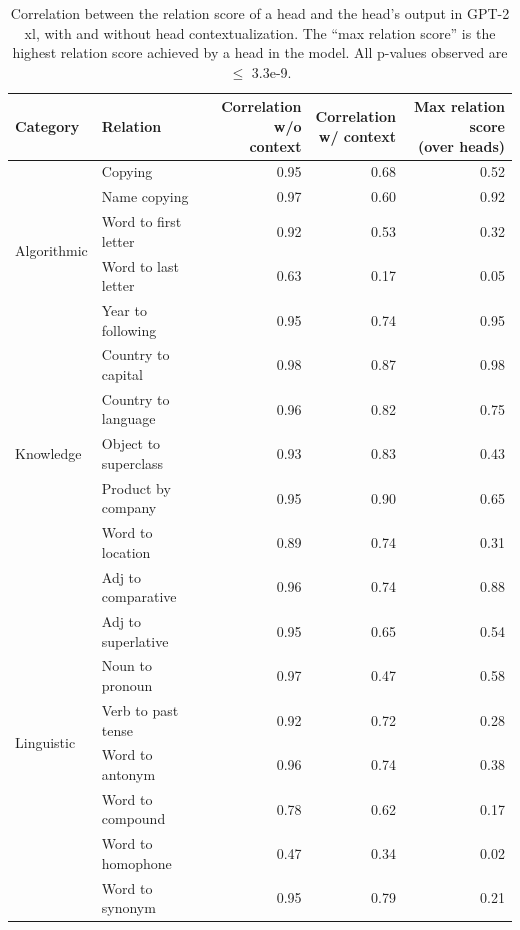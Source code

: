 \documentclass[11pt]{article}
\newcommand{\GPTxl}{GPT-2 xl}
\begin{document}
\begin{table}[p]
\centering
\footnotesize

\begin{tabular}{llrrr}
\toprule
Category & Relation & \makecell{Correlation\\w/o context} & \makecell{Correlation\\w/ context} &  \makecell{Max relation score\\(over heads)} \\
\midrule
\multirow{5}{*}{Algorithmic} & Copying & 0.95 &  0.68  & 0.52 \\
 & Name copying & 0.97 &  0.60  & 0.92 \\
 & Word to first letter & 0.92 &  0.53  & 0.32 \\
 & Word to last letter & 0.63  & 0.17  & 0.05 \\
 & Year to following & 0.95 &  0.74  & 0.95 \\
\midrule
\multirow{5}{*}{Knowledge} & Country to capital & 0.98 &  0.87 &  0.98 \\
 & Country to language & 0.96 &  0.82  & 0.75 \\
 & Object to superclass & 0.93 &  0.83  & 0.43 \\
 & Product by company & 0.95 &  0.90 &  0.65 \\
 & Word to location & 0.89 &  0.74 & 0.31 \\
\midrule
\multirow{8}{*}{Linguistic} & Adj to comparative & 0.96 &  0.74  & 0.88 \\
 & Adj to superlative & 0.95 &  0.65  & 0.54 \\
 & Noun to pronoun & 0.97 &  0.47 &  0.58 \\
 & Verb to past tense & 0.92 &  0.72  & 0.28 \\
 & Word to antonym & 0.96 &  0.74  & 0.38 \\
 & Word to compound & 0.78 & 0.62 & 0.17 \\
 & Word to homophone & 0.47 & 0.34 & 0.02 \\
 & Word to synonym & 0.95 & 0.79 &  0.21 \\
\bottomrule
\end{tabular}

\caption{Correlation between the relation score of a head and the head's output in \GPTxl{}, with and without head contextualization. The ``max relation score'' is the highest relation score achieved by a head in the model. All p-values observed are $\leq$ 3.3e-9.} 
\label{tab:Dynamic_results_gpt_xl}
\end{table}
\end{document}
